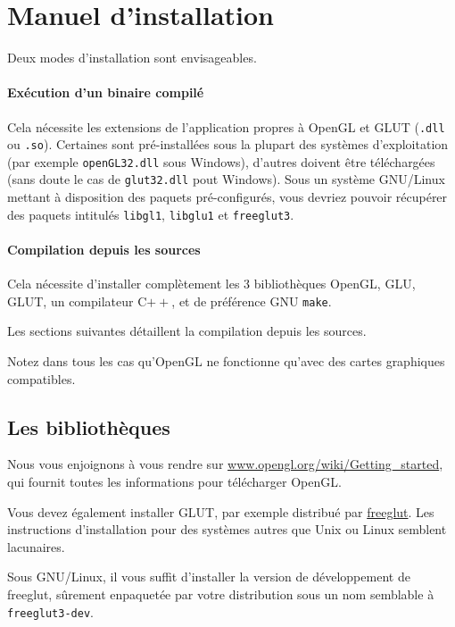 \documentclass[a4paper, oneside, 11pt, twocolumn]{article}
\begin{document}
\clearpage
\appendix

\section{Manuel d'installation}

Deux modes d'installation sont envisageables.

\paragraph{Exécution d'un binaire compilé} Cela nécessite les extensions de l'application propres à OpenGL et GLUT (\texttt{.dll} ou \texttt{.so}). Certaines sont pré-installées sous la plupart des systèmes d'exploitation (par exemple \texttt{openGL32.dll} sous Windows), d'autres doivent être téléchargées (sans doute le cas de \texttt{glut32.dll} pout Windows). Sous un système GNU/Linux mettant à disposition des paquets pré-configurés, vous devriez pouvoir récupérer des paquets intitulés \texttt{libgl1}, \texttt{libglu1} et \texttt{freeglut3}.

\paragraph{Compilation depuis les sources} Cela nécessite d'installer complètement les 3 bibliothèques OpenGL, GLU, GLUT, un compilateur C$++$, et de préférence GNU \texttt{make}.

Les sections suivantes détaillent la compilation depuis les sources.

Notez dans tous les cas qu'OpenGL ne fonctionne qu'avec des cartes graphiques compatibles.

\subsection{Les bibliothèques}

Nous vous enjoignons à vous rendre sur \href{https://www.opengl.org/wiki/Getting_started}{www.opengl.org/wiki/Getting\_started}, qui fournit toutes les informations pour télécharger OpenGL.

Vous devez également installer GLUT, par exemple distribué par \href{http://freeglut.sourceforge.net/docs/install.php}{freeglut}. Les instructions d'installation pour des systèmes autres que Unix ou Linux semblent lacunaires.

Sous GNU/Linux, il vous suffit d'installer la version de développement de freeglut, sûrement enpaquetée par votre distribution sous un nom semblable à \texttt{freeglut3-dev}.
\end{document}
